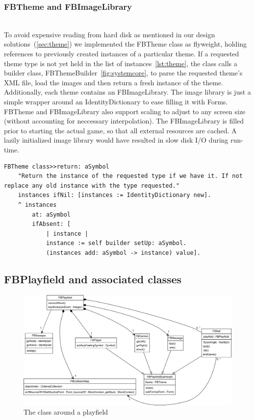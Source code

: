 \subsubsection{FBTheme and FBImageLibrary}~\\ 
To avoid expensive reading from hard disk as mentioned in our design solutions~(\ref{sec:theme})
we implemented the FBTheme class as flyweight, holding references to previously 
created instances of a particular theme. If a requested theme type is not yet 
held in the list of instances~\ref{lst:theme}, the class calls a builder class, 
FBThemeBuilder~\ref{fig:systemcore}, to parse the requested theme's XML file, 
load the images and then return a fresh instance of the theme. Additionally, 
each theme contains an FBImageLibrary. The image library is just a simple 
wrapper around an IdentityDictionary to ease filling it with Forms. 
FBTheme and FBImageLibrary also support scaling to adjust to any screen 
size (without accounting for neccessary interpolation).
The FBImageLibrary is filled prior to starting the actual game, so 
that all external resources are cached. A lazily initialized image 
library would have resulted in slow disk I/O during
run-time.
%
\begin{lstlisting}[language=Smalltalk, label=lst:theme, caption= FBTheme "return:" method, float]
FBTheme class>>return: aSymbol
    "Return the instance of the requested type if we have it. If not replace any old instance with the type requested."
    instances ifNil: [instances := IdentityDictionary new].
    ^ instances 
        at: aSymbol 
        ifAbsent: [
            | instance |
            instance := self builder setUp: aSymbol.
            (instances add: aSymbol -> instance) value].
\end{lstlisting}
%
\subsection{FBPlayfield and associated classes}
%
\begin{figure}[bt]
  \begin{center}
    \includegraphics[width=\linewidth]{images/systemplay.png}
  \end{center}
  \caption{The class around a playfield}
  \label{fig:systemplay}
\end{figure}
%
